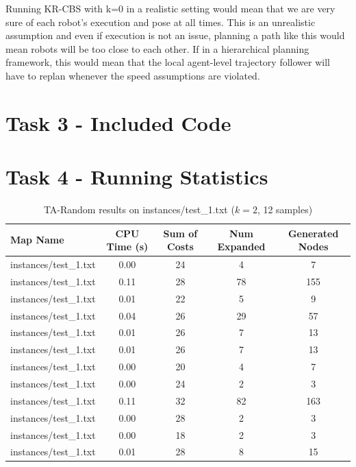 \documentclass[11pt]{article}
\begin{document}
    Running KR-CBS with k=0 in a realistic setting would mean that we are very sure of each robot's execution and pose at all times.
    This is an unrealistic assumption and even if execution is not an issue, planning a path like this would mean robots will be too close to each other.
    If in a hierarchical planning framework, this would mean that the local agent-level trajectory follower will have to replan whenever the speed assumptions are violated.


\section*{Task 3 - Included Code}
\section*{Task 4 - Running Statistics}

    \begin{table}[h]
  \centering
  \begin{tabular}{|l|c|c|c|c|}
  \hline
  \textbf{Map Name} & \textbf{CPU Time (s)} & \textbf{Sum of Costs} & \textbf{Num Expanded} & \textbf{Generated Nodes} \\
  \hline
  instances/test\_1.txt & 0.00 & 24 & 4  & 7   \\
  instances/test\_1.txt & 0.11 & 28 & 78 & 155 \\
  instances/test\_1.txt & 0.01 & 22 & 5  & 9   \\
  instances/test\_1.txt & 0.04 & 26 & 29 & 57  \\
  instances/test\_1.txt & 0.01 & 26 & 7  & 13  \\
  instances/test\_1.txt & 0.01 & 26 & 7  & 13  \\
  instances/test\_1.txt & 0.00 & 20 & 4  & 7   \\
  instances/test\_1.txt & 0.00 & 24 & 2  & 3   \\
  instances/test\_1.txt & 0.11 & 32 & 82 & 163 \\
  instances/test\_1.txt & 0.00 & 28 & 2  & 3   \\
  instances/test\_1.txt & 0.00 & 18 & 2  & 3   \\
  instances/test\_1.txt & 0.01 & 28 & 8  & 15  \\
  \hline
  \end{tabular}
  \caption{TA-Random results on instances/test\_1.txt ($k=2$, 12 samples)}
  \label{tab:ta_random_stats}
  \end{table}
\end{document}

